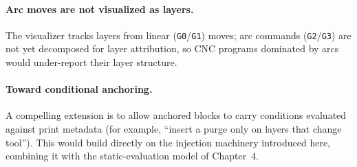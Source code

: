 \paragraph{Arc moves are not visualized as layers.}
The visualizer tracks layers from linear (\texttt{G0}/\texttt{G1}) moves; arc commands (\texttt{G2}/\texttt{G3}) are not yet decomposed for layer attribution, so CNC programs dominated by arcs would under-report their layer structure.

\paragraph{Toward conditional anchoring.}
A compelling extension is to allow anchored blocks to carry conditions evaluated against print metadata (for example, ``insert a purge only on layers that change tool''). This would build directly on the injection machinery introduced here, combining it with the static-evaluation model of Chapter~4.
